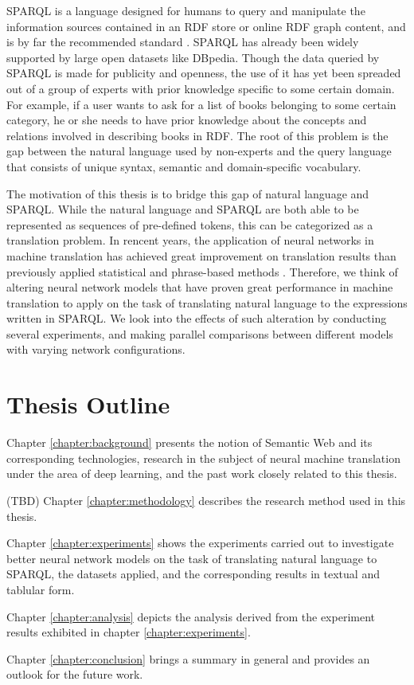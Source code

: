 SPARQL is a language designed for humans to query and manipulate the information sources contained in an RDF store or online RDF graph content, and is by far the recommended standard \cite{Harris2013}. SPARQL has already been widely supported by large open datasets like DBpedia. Though the data queried by SPARQL is made for publicity and openness, the use of it has yet been spreaded out of a group of experts with prior knowledge specific to some certain domain. For example, if a user wants to ask for a list of books belonging to some certain category, he or she needs to have prior knowledge about the concepts and relations involved in describing books in RDF. The root of this problem is the gap between the natural language used by non-experts and the query language that consists of unique syntax, semantic and domain-specific vocabulary. 

The motivation of this thesis is to bridge this gap of natural language and SPARQL. While the natural language and SPARQL are both able to be represented as sequences of pre-defined tokens, this can be categorized as a translation problem. In rencent years, the application of neural networks in machine translation has achieved great improvement on translation results than previously applied statistical and phrase-based methods \cite{Moussallem2017}. Therefore, we think of altering neural network models that have proven great performance in machine translation to apply on the task of translating natural language to the expressions written in SPARQL. We look into the effects of such alteration by conducting several experiments, and making parallel comparisons between different models with varying network configurations. 

\section{Thesis Outline} \label{section:thesis outline}

Chapter \ref{chapter:background} presents the notion of Semantic Web and its corresponding technologies, research in the subject of neural machine translation under the area of deep learning, and the past work closely related to this thesis. 

(TBD) Chapter \ref{chapter:methodology} describes the research method used in this thesis.

Chapter \ref{chapter:experiments} shows the experiments carried out to investigate better neural network models on the task of translating natural language to SPARQL, the datasets applied, and the corresponding results in textual and tablular form.

Chapter \ref{chapter:analysis} depicts the analysis derived from the experiment results exhibited in chapter \ref{chapter:experiments}.

Chapter \ref{chapter:conclusion} brings a summary in general and provides an outlook for the future work.